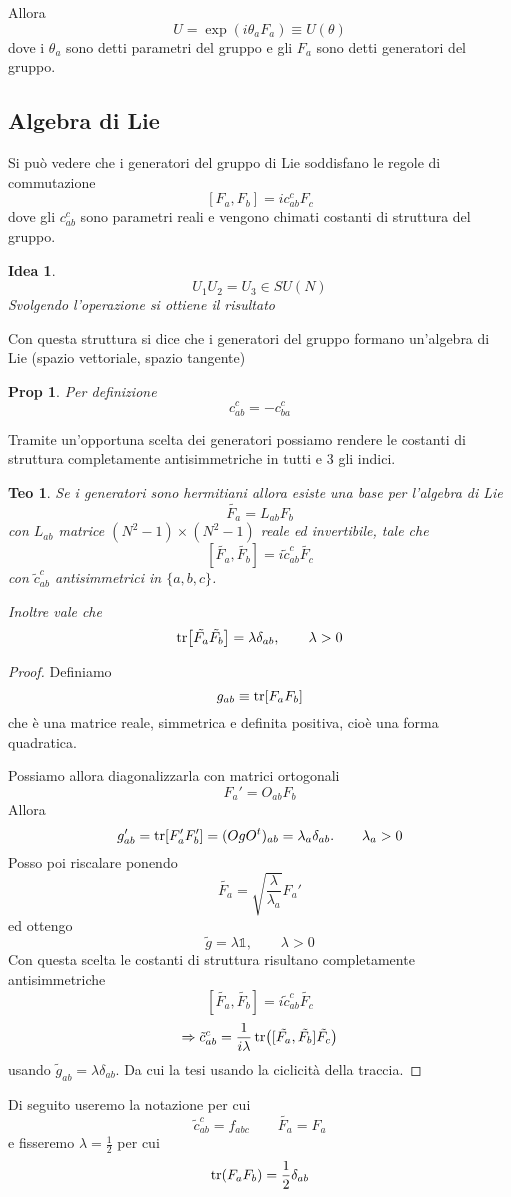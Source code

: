 \documentclass[10pt,a4paper]{article}
\newtheorem{thm}{Teo}[section]
\newtheorem{prop}{Prop}[section]
\newtheorem*{idea}{Idea}
\theoremstyle{definition}
\begin{document}
Allora
\[
U = \exp \left( i \theta_a F_a  \right) \equiv U(\theta)    
\]
dove i \(\theta_a \) sono detti parametri del gruppo e gli $F_a$ sono detti generatori del gruppo.

\subsection{Algebra di Lie}
Si può vedere che i generatori del gruppo di Lie soddisfano le regole di commutazione   
\[
    [F_a, F_b] = i c_{ab}^c F_c 
\]
dove gli $c_{ab}^c$ sono parametri reali e vengono chimati costanti di struttura del gruppo.

\begin{idea}
    \[
    U_1 U_2 = U_3 \in SU(N)    
    \]
    Svolgendo l'operazione si ottiene il risultato
\end{idea}
Con questa struttura si dice che i generatori del gruppo formano un'algebra di Lie (spazio vettoriale, spazio tangente)
\begin{prop}
    Per definizione 
    \[
    c_{ab}^c = -c_{ba}^c     
    \]
\end{prop}
Tramite un'opportuna scelta dei generatori possiamo rendere le costanti di struttura completamente antisimmetriche in tutti e 3 gli indici.

\begin{thm}
    Se i generatori sono hermitiani allora esiste una base per l'algebra di Lie 
    \[
    \tilde{F_a} = L_{ab} F_b     
    \]
    con $L_{ab}$ matrice $(N^2 - 1)\times(N^2 - 1)$ reale ed invertibile, tale che
    \[
    [\tilde{F_a}, \tilde{F_b}] = i \tilde{c}_{ab}^c \tilde{F_c}    
    \]
    con $\tilde{c}_{ab}^c$ antisimmetrici in $\{a, b, c\}$.
    
    Inoltre vale che
    \[
    \tr[\tilde{F_a}\tilde{F_b}] = \lambda \delta_{ab}, \qquad \lambda > 0     
    \]
\end{thm}

\begin{proof}
    Definiamo 
    \[
    g_{ab} \equiv \tr[F_a F_b]    
    \]
    che è una matrice reale, simmetrica e definita positiva, cioè una forma quadratica.

    Possiamo allora diagonalizzarla con matrici ortogonali
    \[
    F_a' = O_{ab} F_b    
    \]
    Allora 
    \[
    g_{ab}' = \tr [F_a' F_b'] = (O g O^t)_{ab} = \lambda_a \delta_{ab}. \qquad \lambda_a > 0     
    \]
    Posso poi riscalare ponendo
    \[
    \tilde{F_a} = \sqrt{\frac{\lambda}{\lambda_a}}F_a'    
    \]
    ed ottengo
    \[
    \tilde{g} = \lambda \mathbb{1}, \qquad \lambda > 0    
    \]
    Con questa scelta le costanti di struttura risultano completamente antisimmetriche
    \[
    [\tilde{F_a}, \tilde{F_b}] = i \tilde{c}_{ab}^c \tilde{F_c}    
    \]
    \[
    \Rightarrow \tilde{c}_{ab}^c = \frac{1}{i\lambda}\tr([\tilde{F_a}, \tilde{F_b}]\tilde{F_c})    
    \]
    usando $\tilde{g}_{ab} = \lambda \delta_{ab}$. Da cui la tesi usando la ciclicità della traccia.

\end{proof} 
Di seguito useremo la notazione per cui 
\[
    \tilde{c}_{ab}^c = f_{abc} \qquad \tilde{F_a} = F_a 
\]
e fisseremo $\lambda = \frac12$ per cui
\[
\tr(F_a F_b) = \frac12 \delta_{ab}    
\]
\end{document}
